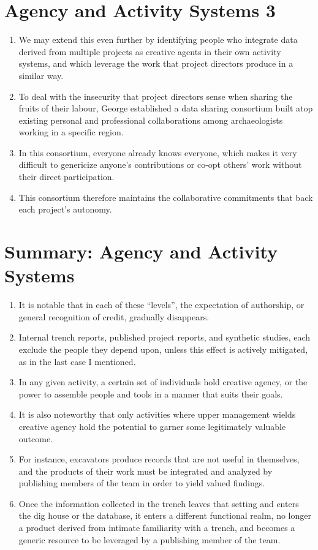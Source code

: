 \documentclass[12pt]{article}
\begin{document}
\section{Agency and Activity Systems 3}
\begin{enumerate}
  \item We may extend this even further by identifying people who integrate data derived from multiple projects as creative agents in their own activity systems, and which leverage the work that project directors produce in a similar way.
  \item To deal with the insecurity that project directors sense when sharing the fruits of their labour, George established a data sharing consortium built atop existing personal and professional collaborations among archaeologists working in a specific region.
  \item In this consortium, everyone already knows everyone, which makes it very difficult to genericize anyone's contributions or co-opt others' work without their direct participation.
  \item This consortium therefore maintains the collaborative commitments that back each project's autonomy.
\end{enumerate}

\section{Summary: Agency and Activity Systems}
\begin{enumerate}
  \item It is notable that in each of these ``levels'', the expectation of authorship, or general recognition of credit, gradually disappears.
  \item Internal trench reports, published project reports, and synthetic studies, each exclude the people they depend upon, unless this effect is actively mitigated, as in the last case I mentioned.
  \item In any given activity, a certain set of individuals hold creative agency, or the power to assemble people and tools in a manner that suits their goals.
  \item It is also noteworthy that only activities where upper management wields creative agency hold the potential to garner some legitimately valuable outcome.
  \item For instance, excavators produce records that are not useful in themselves, and the products of their work must be integrated and analyzed by publishing members of the team in order to yield valued findings.
  \item Once the information collected in the trench leaves that setting and enters the dig house or the database, it enters a different functional realm, no longer a product derived from intimate familiarity with a trench, and becomes a generic resource to be leveraged by a publishing member of the team.
\end{enumerate}
\end{document}
